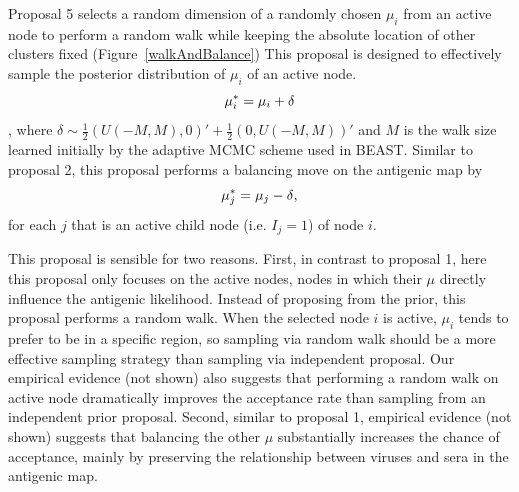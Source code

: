 \documentclass[11pt,oneside,letterpaper]{article}
\begin{document}
Proposal 5 selects a random dimension of a randomly chosen $\mu_i$ from an active node to perform a random walk while keeping the absolute location of other clusters fixed (Figure~\ref{walkAndBalance})
This proposal is designed to effectively sample the posterior distribution of $\mu_i$ of an active node. 
\begin{equation}
	\mu_i^{*} =  \mu_i + \delta \\
\end{equation},
where $\delta \sim \frac{1}{2} (U(-M, M), 0)' + \frac{1}{2} (0, U(-M, M))'$ and $M$ is the walk size learned initially by the adaptive MCMC scheme used in BEAST.
Similar to proposal 2, this proposal performs a balancing move on the antigenic map by
\begin{equation}
	\mu_j^{*} =  \mu_j - \delta\\     ,
\label{balance_mu}
\end{equation}
for each $j$ that is an active child node (i.e. $I_j = 1$) of node $i$.




This proposal is sensible for two reasons.
First, in contrast to proposal 1, here this proposal only focuses on the active nodes, nodes in which their $\mu$ directly influence the antigenic likelihood.
Instead of proposing from the prior, this proposal performs a random walk.
When the selected node $i$ is active, $\mu_i$ tends to prefer to be in a specific region, so sampling via random walk should be a more effective sampling strategy than sampling via independent proposal.
Our empirical evidence (not shown) also suggests that performing a random walk on active node dramatically improves the acceptance rate than sampling from an independent prior proposal.
Second, similar to proposal 1, empirical evidence (not shown) suggests that balancing the other $\mu$ substantially increases the chance of acceptance, mainly by preserving the relationship between viruses and sera in the antigenic map.
\end{document}
